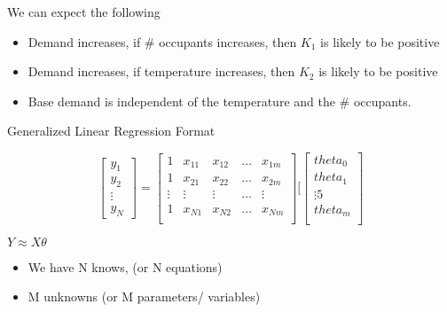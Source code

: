 \documentclass{beamer}
\begin{document}
\begin{frame}{We can expect the following}
    \begin{itemize}
        \item Demand increases, if \# occupants increases, then $K_{1}$ is likely to be positive
        
        \item Demand increases, if temperature increases, then $K_{2}$ is likely to be positive
        
        \item Base demand is independent of the temperature and the \# occupants.
        
    \end{itemize}
\end{frame}


\begin{frame}{Generalized Linear Regression Format}


    \[\begin{bmatrix}
        y_{1}\\
        y_{2} \\
        \vdots \\
        y_{N}
    \end{bmatrix}
    =     \begin{bmatrix}
        1 & x_{11} & x_{12} & \dots & x_{1m}\\
        1 & x_{21} & x_{22} & \dots & x_{2m}\\
        \vdots & \vdots & \vdots & \dots & \vdots\\
        1 & x_{N1} & x_{N2} & \dots & x_{Nm}\\
    \end{bmatrix}
    [\begin{bmatrix}
        theta_{0}\\
        theta_{1}\\
        \vdots{5} \\
        theta_{m}\\
    \end{bmatrix}
   \]
   
   
   \begin{tcolorbox}
   \begin{center}
       
   
       
   
   $ Y \approx X\theta$
   \end{center}
   \end{tcolorbox}
   
   \begin{itemize}
       \item We have N knows, (or N equations)
       \item M unknowns (or M parameters/ variables)
   \end{itemize}
   
\end{frame}
\end{document}
